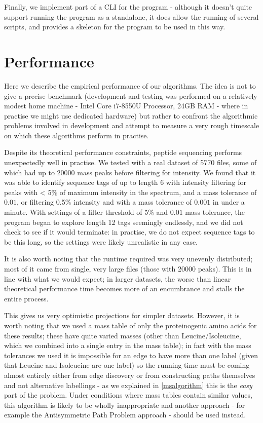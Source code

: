 \documentclass{l4proj}
\newcommand{\cit}[1]{\citep{#1}}
\begin{document}
Finally, we implement part of a CLI for the program - although it doesn't quite support running the program as a standalone, it does allow the running of several scripts, and provides a skeleton for the program to be used in this way.

\section{Performance}

Here we describe the empirical performance of our algorithms. The idea is not to give a precise benchmark (development and testing was performed on a relatively modest home machine - Intel Core i7-8550U Processor, 24GB RAM - where in practise we might use dedicated hardware) but rather to confront the algorithmic problems involved in development and attempt to measure a very rough timescale on which these algorithms perform in practise.

Despite its theoretical performance constraints, peptide sequencing performs unexpectedly well in practise. We tested with a real dataset of 5770 files, some of which had up to 20000 mass peaks before filtering for intensity. We found that it was able to identify sequence tags of up to length 6 with intensity filtering for peaks with < 5\% of maximum intensity in the spectrum, and a mass tolerance of \(0.01\), or filtering 0.5\% intensity and with a mass tolerance of \(0.001\) in under a minute. With settings of a filter threshold of 5\% and \(0.01\) mass tolerance, the program began to explore length 12 tags seemingly endlessly, and we did not check to see if it would terminate: in practise, we do not expect sequence tags to be this long, so the settings were likely unrealistic in any case. 

It is also worth noting that the runtime required was very unevenly distributed; most of it came from single, very large files (those with 20000 peaks). This is in line with what we would expect; in larger datasets, the worse than linear theoretical performance time becomes more of an encumbrance and stalls the entire process.

This gives us very optimistic projections for simpler datasets. However, it is worth noting that we used a mass table of only the proteinogenic amino acids for these results; these have quite varied masses (other than Leucine/Isoleucine, which we combined into a single entry in the mass table); in fact with the mass tolerances we used it is impossible for an edge to have more than one label (given that Leucine and Isoleucine are one label) so the running time must be coming almost entirely either from edge discovery or from constructing paths themselves and not alternative labellings - as we explained in \ref{msalgorithm} this is the \textit{easy} part of the problem. Under conditions where mass tables contain similar values, this algorithm is likely to be wholly inappropriate and another approach - for example the Antisymmetric Path Problem approach \cit{msbook} - should be used instead.
\end{document}
